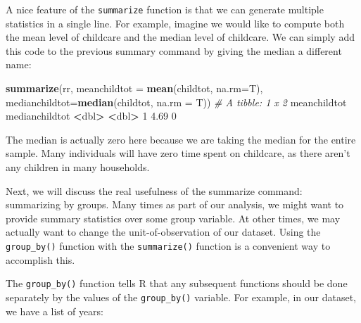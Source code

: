 \documentclass[
]{book}
\newenvironment{Shaded}{\begin{snugshade}}{\end{snugshade}}
\newcommand{\AttributeTok}[1]{\textcolor[rgb]{0.13,0.29,0.53}{#1}}
\newcommand{\CommentTok}[1]{\textcolor[rgb]{0.56,0.35,0.01}{\textit{#1}}}
\newcommand{\ConstantTok}[1]{\textcolor[rgb]{0.56,0.35,0.01}{#1}}
\newcommand{\DecValTok}[1]{\textcolor[rgb]{0.00,0.00,0.81}{#1}}
\newcommand{\ErrorTok}[1]{\textcolor[rgb]{0.64,0.00,0.00}{\textbf{#1}}}
\newcommand{\FloatTok}[1]{\textcolor[rgb]{0.00,0.00,0.81}{#1}}
\newcommand{\FunctionTok}[1]{\textcolor[rgb]{0.13,0.29,0.53}{\textbf{#1}}}
\newcommand{\NormalTok}[1]{#1}
\newcommand{\SpecialCharTok}[1]{\textcolor[rgb]{0.81,0.36,0.00}{\textbf{#1}}}
\begin{document}
A nice feature of the \texttt{summarize} function is that we can generate multiple statistics in a single line. For example, imagine we would like to compute both the mean level of childcare and the median level of childcare. We can simply add this code to the previous summary command by giving the median a different name:

\begin{Shaded}
\begin{Highlighting}[]
\FunctionTok{summarize}\NormalTok{(rr, }
          \AttributeTok{meanchildtot =} \FunctionTok{mean}\NormalTok{(childtot, }\AttributeTok{na.rm=}\NormalTok{T),}
          \AttributeTok{medianchildtot=}\FunctionTok{median}\NormalTok{(childtot, }\AttributeTok{na.rm =}\NormalTok{ T))}
\CommentTok{\# A tibble: 1 x 2}
\NormalTok{  meanchildtot medianchildtot}
         \SpecialCharTok{\textless{}}\NormalTok{dbl}\SpecialCharTok{\textgreater{}}          \ErrorTok{\textless{}}\NormalTok{dbl}\SpecialCharTok{\textgreater{}}
\DecValTok{1}         \FloatTok{4.69}              \DecValTok{0}
\end{Highlighting}
\end{Shaded}

The median is actually zero here because we are taking the median for the entire sample. Many individuals will have zero time spent on childcare, as there aren't any children in many households.

Next, we will discuss the real usefulness of the summarize command: summarizing by groups. Many times as part of our analysis, we might want to provide summary statistics over some group variable. At other times, we may actually want to change the unit-of-observation of our dataset. Using the \texttt{group\_by()} function with the \texttt{summarize()} function is a convenient way to accomplish this.

The \texttt{group\_by()} function tells R that any subsequent functions should be done separately by the values of the \texttt{group\_by()} variable. For example, in our dataset, we have a list of years:

\begin{Shaded}
\end{Shaded}
\end{document}

